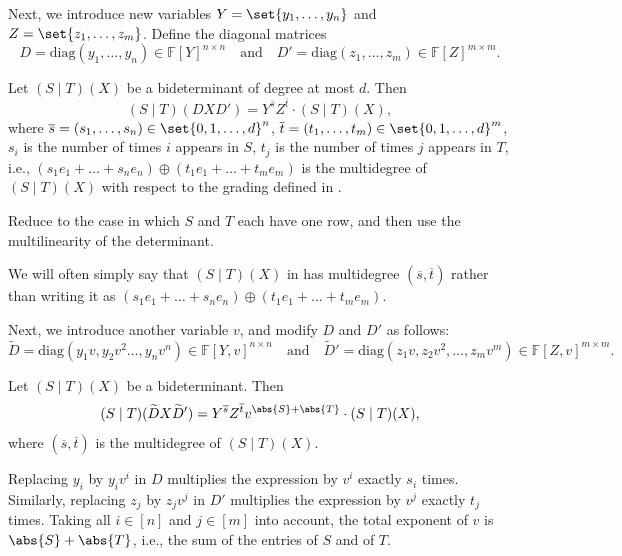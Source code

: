 \documentclass[10pt,a4paper]{amsart}
\newcommand*\ie{i.e.}
\newcommand*\F{\mathbb{F}}
\begin{document}
Next, we introduce new variables $Y = \set{y_1,\dots,y_n}$ and $Z = \set{z_1,\dots,z_m}$.
Define the diagonal matrices 
\[
    D = \mathrm{diag}(y_1,\dots,y_n)\in\F[Y]^{n\times n} \quad\text{and}\quad D'=\mathrm{diag}(z_1,\dots,z_m)\in\F[Z]^{m\times m}.
\]

\begin{lem}\label{lem:diagonals}
Let $(S\mid T)(X)$ be a bideterminant of degree at most $d$.
Then 
\[
  (S\mid T)(D X D')=Y^{\overline{s}} Z^{\overline{t}}\cdot  (S\mid T)(X),
\]
where $\overline{s}=(s_1,\dots,s_n)\in \set{0,1,\dots,d}^n$, $\overline{t}=(t_1,\dots,t_m)\in \set{0,1,\dots,d}^m$, $s_i$ is the number of times $i$ appears in $S$, $t_j$ is the number of times $j$ appears in $T$, \ie, $(s_1 e_1+ \dots + s_n e_n)\oplus (t_1 e_1 + \dots + t_m e_m)$ is the multidegree of $(S\mid T)(X)$ with respect to the grading defined in .
\end{lem}
\begin{pf}
Reduce to the case in which $S$ and $T$ each have one row, and then use the multilinearity of the determinant.
\end{pf}
We will often simply say that $(S \mid T)(X)$ in  has multidegree $(\overline{s}, \overline{t})$ rather than writing it as $(s_1 e_1 + \dots + s_n e_n) \oplus (t_1 e_1 + \dots + t_m e_m)$.

Next, we introduce another variable $v$, and modify $D$ and $D'$ as follows:
\[
    \widetilde{D} = \mathrm{diag}(y_1 v, y_2 v^2\dots,y_n v^n )\in\F[Y,v]^{n\times n} \quad\text{and}\quad \widetilde{D}'=\mathrm{diag}(z_1 v,z_2 v^2,\dots,z_m v^m)\in\F[Z,v]^{m\times m}.
\]
\begin{lem}\label{lem:multiply-by-diag}
    Let $(S\mid T)(X)$ be a bideterminant.
    Then 
    \[
        (S\mid T)(\widetilde{D} X \widetilde{D}')=Y^{\overline{s}} Z^{\overline{t}} v^{\abs{S} + \abs{T}} \cdot (S\mid T)(X),
    \]
    where $(\overline{s},\overline{t})$ is the multidegree of $(S\mid T)(X)$.
\end{lem}

\begin{pf}
Replacing $y_i$ by $y_i v^i$ in $D$ multiplies the expression by $v^i$ exactly $s_i$ times.  
Similarly, replacing $z_j$ by $z_j v^j$ in $D'$ multiplies the expression by $v^j$ exactly $t_j$ times.  
Taking all $i \in [n]$ and $j \in [m]$ into account, the total exponent of $v$ is $\abs{S} + \abs{T}$, \ie, the sum of the entries of $S$ and of $T$.
\end{pf}
\end{document}
